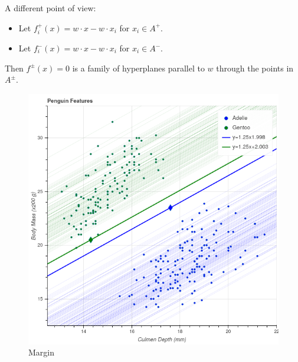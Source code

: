 \documentclass[
  14pt,
]{extarticle}
\providecommand{\tightlist}{%
  \setlength{\itemsep}{0pt}\setlength{\parskip}{0pt}}
\begin{document}
A different point of view:

\begin{itemize}
\tightlist
\item
  Let \(f^{+}_{i}(x)=w\cdot x-w\cdot x_{i}\) for \(x_{i}\in A^{+}\).\\
\item
  Let \(f^{-}_{i}(x) = w\cdot x -w\cdot x_{i}\) for \(x_{i}\in A^{-}\).
\end{itemize}

Then \(f^{\pm}(x)=0\) is a family of hyperplanes parallel to \(w\)
through the points in \(A^{\pm}\).

\begin{figure}
\centering
\includegraphics{../img/penguinhwy2.png}
\caption{Margin}
\end{figure}
\end{document}
